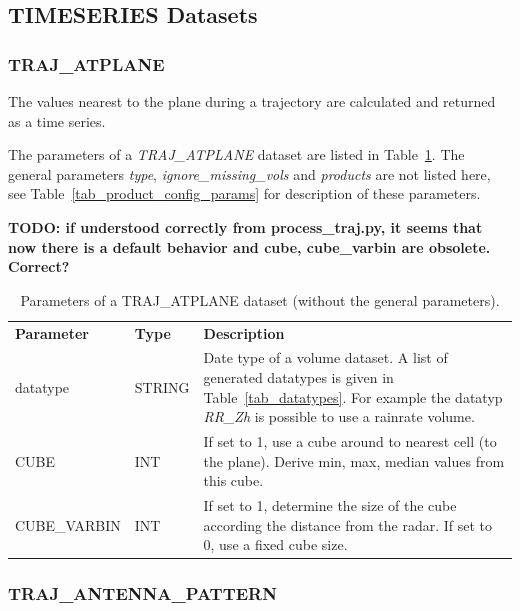 \documentclass[a4paper,11pt,pdftex,twoside]{scrartcl}
\renewcommand{\bf}{\normalfont \bfseries}
\begin{document}
{{{\subsection{TIMESERIES Datasets}

\subsubsection{TRAJ\_ATPLANE}
\label{subsec_traj_atplane}

The values nearest to the plane during a trajectory are calculated and returned as
a time series.

The parameters of a \emph{TRAJ\_ATPLANE} dataset are listed in Table~\ref{tab_dataset_atplane}.
The general parameters \emph{type}, \emph{ignore\_missing\_vols}
and \emph{products} are not listed here, see Table~\ref{tab_product_config_params} for
description of these parameters.

{\bf TODO: if understood correctly from process\_traj.py, it seems that now there is a default behavior and cube, cube\_varbin are obsolete. Correct?}

\begin{table}[H]
\begin{tabularx}{\textwidth}{llX}
\bf{Parameter}  & \bf{Type}  & \bf{Description}\\
datatype       & STRING     & Date type of a volume dataset. A list of generated
                              datatypes is given in Table~\ref{tab_datatypes}. For example the
                              datatyp \emph{RR\_Zh} is possible to use a rainrate
                              volume.\\
CUBE          & INT         & If set to 1, use a cube around to nearest cell (to the plane).
                              Derive min, max, median values from this cube.\\
CUBE\_VARBIN  & INT         & If set to 1, determine the size of the cube according the distance
                              from the radar. If set to 0, use a fixed cube size.\\
\end{tabularx}
\caption{Parameters of a TRAJ\_ATPLANE dataset (without the general parameters).}
\label{tab_dataset_atplane}
\end{table}

\subsubsection{TRAJ\_ANTENNA\_PATTERN}
\label{subsec_traj_antennapattern}

}}}
\end{document}
